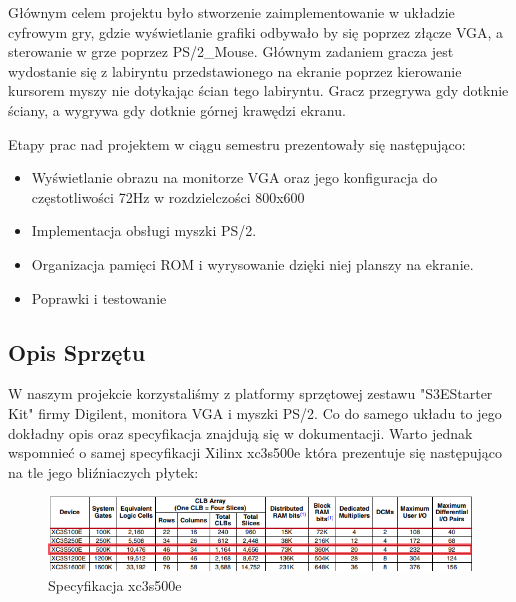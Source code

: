 \documentclass[a4paper]{article}
\begin{document}
Głównym celem projektu było stworzenie zaimplementowanie w układzie cyfrowym gry, gdzie wyświetlanie grafiki odbywało by się poprzez złącze VGA, a sterowanie w grze poprzez PS/2\_Mouse. Głównym zadaniem gracza jest wydostanie się z labiryntu przedstawionego na ekranie poprzez kierowanie kursorem myszy nie dotykając ścian tego labiryntu. Gracz przegrywa gdy dotknie ściany, a wygrywa gdy dotknie górnej krawędzi ekranu.

Etapy prac nad projektem w ciągu semestru prezentowały się następująco:

\begin{itemize}

	\item Wyświetlanie obrazu na monitorze VGA oraz jego konfiguracja do częstotliwości 72Hz w rozdzielczości 800x600
    
    \item Implementacja obsługi myszki PS/2.
    
	\item Organizacja pamięci ROM i wyrysowanie dzięki niej planszy na ekranie.
    
    \item Poprawki i testowanie

\end{itemize}

\subsection{Opis Sprzętu}

W naszym projekcie korzystaliśmy z platformy sprzętowej zestawu "S3EStarter Kit" firmy Digilent, monitora VGA i myszki PS/2. Co do samego układu to jego dokładny opis oraz specyfikacja znajdują się w dokumentacji. Warto jednak wspomnieć o samej specyfikacji Xilinx xc3s500e która prezentuje się następująco na tle jego bliźniaczych płytek:

\begin{figure}[h]
  \caption{Specyfikacja xc3s500e}
  \includegraphics[scale=0.7]{xc3s500e.png}
  \centering
\end{figure}
\end{document}
